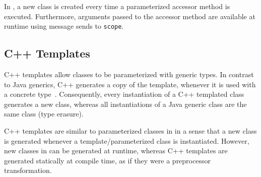 In \msname, a new class is created every time a parameterized accessor method is executed. Furthermore, arguments passed to the accessor method are available at runtime using message sends to \texttt{scope}.

\subsection{C++ Templates}
C++ templates allow classes to be parameterized with generic types. In contrast to Java generics, C++ generates a copy of the template, whenever it is used with a concrete type~\cite{vandevoorde2002cpp}. Consequently, every instantiation of a C++ templated class generates a new class, whereas all instantiations of a Java generic class are the same class (type erasure).

C++ templates are similar to parameterized classes in \msname in a sense that a new class is generated whenever a template/parameterized class is instantiated. However, new classes in \msname can be generated at runtime, whereas C++ templates are generated statically at compile time, as if they were a preprocessor transformation.

